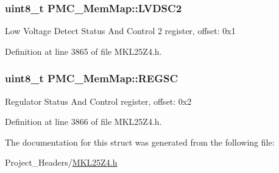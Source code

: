 \subsubsection[{\texorpdfstring{L\+V\+D\+S\+C2}{LVDSC2}}]{\setlength{\rightskip}{0pt plus 5cm}uint8\+\_\+t P\+M\+C\+\_\+\+Mem\+Map\+::\+L\+V\+D\+S\+C2}\hypertarget{struct_p_m_c___mem_map_a934db8b39dae8b99a9a9165df50145f5}{}\label{struct_p_m_c___mem_map_a934db8b39dae8b99a9a9165df50145f5}
Low Voltage Detect Status And Control 2 register, offset\+: 0x1 

Definition at line 3865 of file M\+K\+L25\+Z4.\+h.

\subsubsection[{\texorpdfstring{R\+E\+G\+SC}{REGSC}}]{\setlength{\rightskip}{0pt plus 5cm}uint8\+\_\+t P\+M\+C\+\_\+\+Mem\+Map\+::\+R\+E\+G\+SC}\hypertarget{struct_p_m_c___mem_map_aa14a55a46cc237589d6c01ebf7676c2a}{}\label{struct_p_m_c___mem_map_aa14a55a46cc237589d6c01ebf7676c2a}
Regulator Status And Control register, offset\+: 0x2 

Definition at line 3866 of file M\+K\+L25\+Z4.\+h.



The documentation for this struct was generated from the following file\+:\begin{DoxyCompactItemize}
\item 
Project\+\_\+\+Headers/\hyperlink{_m_k_l25_z4_8h}{M\+K\+L25\+Z4.\+h}\end{DoxyCompactItemize}
